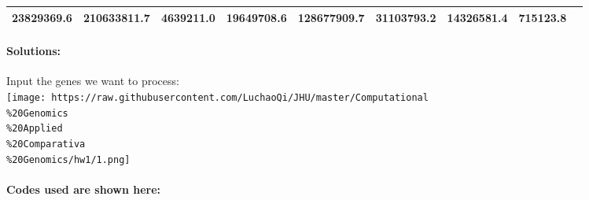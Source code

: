 \documentclass[]{article}
\let\oldparagraph\paragraph
\renewcommand{\paragraph}[1]{\oldparagraph{#1}\mbox{}}
\begin{document}
\begin{longtable}[]{@{}lllllllll@{}}
\begin{minipage}[t]{0.07\columnwidth}
23829369.6\strut
\end{minipage} & \begin{minipage}[t]{0.07\columnwidth}\raggedright\strut
210633811.7\strut
\end{minipage} & \begin{minipage}[t]{0.07\columnwidth}\raggedright\strut
4639211.0\strut
\end{minipage} & \begin{minipage}[t]{0.08\columnwidth}\raggedright\strut
19649708.6\strut
\end{minipage} & \begin{minipage}[t]{0.08\columnwidth}\raggedright\strut
128677909.7\strut
\end{minipage} & \begin{minipage}[t]{0.07\columnwidth}\raggedright\strut
31103793.2\strut
\end{minipage} & \begin{minipage}[t]{0.07\columnwidth}\raggedright\strut
14326581.4\strut
\end{minipage} & \begin{minipage}[t]{0.07\columnwidth}\raggedright\strut
715123.8\strut
\end{minipage}\tabularnewline
\bottomrule
\end{longtable}

\paragraph{Solutions:}\label{solutions}

Input the genes we want to process:\\
\texttt{[image: https://raw.githubusercontent.com/LuchaoQi/JHU/master/Computational\\\%20Genomics\\\%20Applied\\\%20Comparativa\\\%20Genomics/hw1/1.png]}

\paragraph{Codes used are shown here:}\label{codes-used-are-shown-here}
\end{document}
